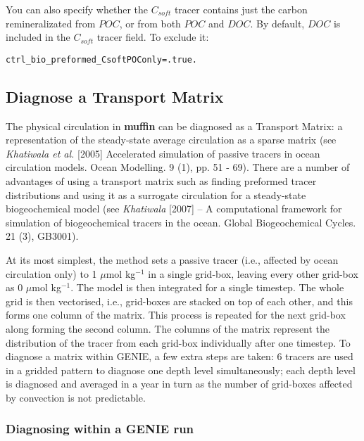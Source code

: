 \documentclass[11pt,fleqn]{book} %
\begin{document}
You can also specify whether the \(C_{soft}\) tracer contains just the carbon remineralizated from \(POC\), or from both \(POC\) and \(DOC\). By default,  \(DOC\) is included in the \(C_{soft}\) tracer field. To exclude it:

\texttt{ctrl\_bio\_preformed\_CsoftPOConly=.true.}

%
\subsection*{Diagnose a Transport Matrix}
\vspace{1mm}

The physical circulation in \textbf{muffin} can be diagnosed as a Transport Matrix: a representation of the steady-state average circulation as a sparse matrix (see \textit{Khatiwala et al.} [2005] Accelerated simulation of passive tracers in ocean circulation models. Ocean Modelling. 9 (1), pp. 51 - 69). There are a number of advantages of using a transport matrix such as finding preformed tracer distributions and using it as a surrogate circulation for a steady-state biogeochemical model (see \textit{Khatiwala} [2007] -- A computational framework for simulation of biogeochemical tracers in the ocean. Global Biogeochemical Cycles. 21 (3), GB3001).

At its most simplest, the method sets a passive tracer (i.e., affected by ocean circulation only) to 1 $\mu$mol kg$^{-1}$ in a single grid-box, leaving every other grid-box as 0 $\mu$mol kg$^{-1}$. The model is then integrated for a single timestep. The whole grid is then vectorised, i.e., grid-boxes are stacked on top of each other, and this forms one column of the matrix. This process is repeated for the next grid-box along forming the second column. The columns of the matrix represent the distribution of the tracer from each grid-box individually after one timestep. To diagnose a matrix within GENIE, a few extra steps are taken: 6 tracers are used in a gridded pattern to diagnose one depth level simultaneously; each depth level is diagnosed and averaged in a year in turn as the number of grid-boxes affected by convection is not predictable.

%
\subsubsection{Diagnosing within a GENIE run}
\vspace{1mm}
\end{document}
